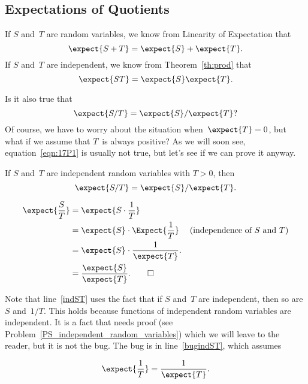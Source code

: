 \begin{editingnotes}

\section{Expectations of Quotients}

If $S$ and~$T$ are random variables, we know from Linearity of
Expectation that
\begin{equation*}
    \expect{S + T} = \expect{S} + \expect{T}.
\end{equation*}
If $S$ and~$T$ are independent, we know from Theorem~\ref{th:prod}
that
\begin{equation*}
    \expect{ST} = \expect{S} \expect{T}.
\end{equation*}

Is it also true that
\begin{equation}\label{eqn:17P1}
    \expect{S/T} = \expect{S}/\expect{T}?
\end{equation}
Of course, we have to worry about the situation when~$\expect{T} = 0$,
but what if we assume that $T$~is always positive?  As we will soon
see, equation~\eqref{eqn:17P1} is usually not true, but let's see if we
can prove it anyway.

\begin{falseclm}\label{fc:17P2}
If $S$ and~$T$ are independent random variables with $T > 0$, then
\begin{equation}
    \expect{S/T} = \expect{S}/\expect{T}.
\end{equation}
\end{falseclm}

\begin{bogusproof}
\begin{align}
\expect{\frac{S}{T}} & = \expect{S \cdot \frac{1}{T}} \notag\\
       & = \expect{S} \cdot \Expect{\frac{1}{T}} & \text{(independence of $S$
       and $T$)}\label{indST}\\
      & = \expect{S} \cdot \frac{1}{\expect{T}}. \label{bugindST}\\
      & = \frac{\expect{S}}{\expect{T}}.\notag \qedhere
\end{align}
\end{bogusproof}
Note that line~\ref{indST} uses the fact that if $S$ and~$T$ are
independent, then so are $S$ and~$1/T$.  This holds because functions
of independent random variables are independent.  It is a fact that
needs proof (see Problem~\ref{PS_independent_random_variables}) which
we will leave to the reader, but it is not the bug.  The bug is in
line~\eqref{bugindST}, which assumes
\begin{falseclm}\label{false-inverse}
\[
\expect{\frac{1}{T}} =  \frac{1}{\expect{T}}.
\]
\end{falseclm}


\end{editingnotes}
